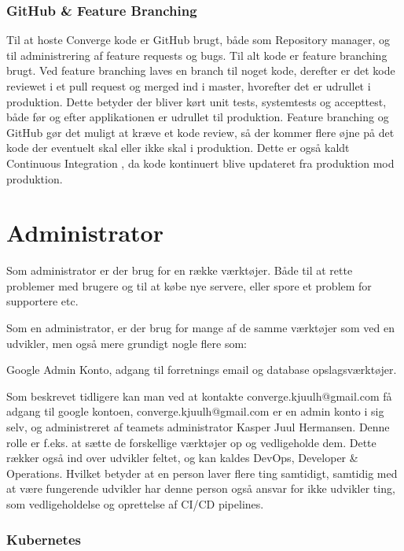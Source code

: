 
\subsubsection{GitHub \& Feature Branching}

Til at hoste Converge kode er GitHub brugt, både som Repository manager, og til administrering af feature requests og bugs. Til alt kode er feature branching brugt. Ved feature branching laves en branch til noget kode, derefter er det kode reviewet i et pull request og merged ind i master, hvorefter det er udrullet i produktion. Dette betyder der bliver kørt unit tests, systemtests og accepttest, både før og efter applikationen er udrullet til produktion. Feature branching og GitHub gør det muligt at kræve et kode review, så der kommer flere øjne på det kode der eventuelt skal eller ikke skal i produktion. Dette er også kaldt Continuous Integration , da kode kontinuert blive updateret fra produktion mod produktion.

\section{Administrator}

Som administrator er der brug for en række værktøjer. Både til at rette problemer med brugere og til at købe nye servere, eller spore et problem for supportere etc.

Som en administrator, er der brug for mange af de samme værktøjer som ved en udvikler, men også mere grundigt nogle flere som:

Google Admin Konto, adgang til forretnings email og database opslagsværktøjer.

Som beskrevet tidligere kan man ved at kontakte converge.kjuulh@gmail.com få adgang til google kontoen, converge.kjuulh@gmail.com er en admin konto i sig selv, og administreret af teamets administrator Kasper Juul Hermansen. Denne rolle er f.eks. at sætte de forskellige værktøjer op og vedligeholde dem. Dette rækker også ind over udvikler feltet, og kan kaldes DevOps, Developer & Operations. Hvilket betyder at en person laver flere ting samtidigt, samtidig med at være fungerende udvikler har denne person også ansvar for ikke udvikler ting, som vedligeholdelse og oprettelse af CI/CD pipelines.

\subsubsection{Kubernetes}

